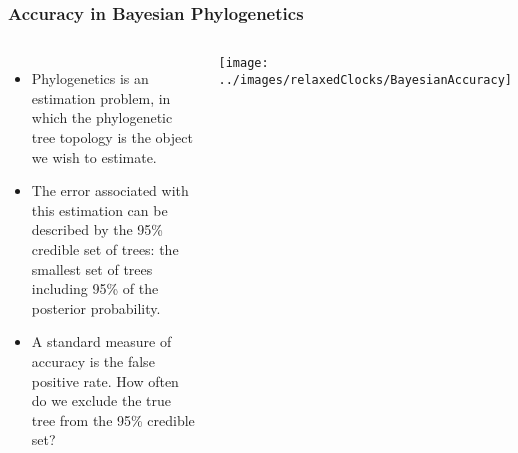 \begin{frame}
\frametitle{Accuracy in Bayesian Phylogenetics}

\begin{columns}


\begin{itemize}
\item Phylogenetics is an estimation problem, in which the phylogenetic tree topology is the object we wish to estimate.
\item The error associated with this estimation can be described by the 95\% credible set of trees: the smallest set of trees including 95\% of the posterior probability.
\item A standard measure of accuracy is the false positive rate. How often do we exclude the true tree from the 95\% credible set?
\end{itemize}


\texttt{[image: ../images/relaxedClocks/BayesianAccuracy]}

\end{columns}

\end{frame}